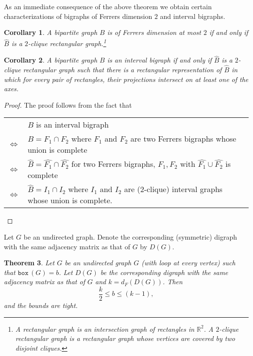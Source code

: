 \documentclass[11pt]{article}
\newtheorem{thm}{Theorem}[section]
\newtheorem{cor}[thm]{Corollary}
\theoremstyle{definition}
\theoremstyle{remark}
\numberwithin{equation}{section}
\newcommand{\Real}{\mathbb{R}}
\newcommand{\BOX}[1]{\texttt{box}\,(#1)}
\begin{document}
As an immediate consequence of the above theorem we obtain certain  characterizations of bigraphs of Ferrers dimension $2$ and interval bigraphs.

\begin{cor}
A bipartite graph $B$ is of Ferrers dimension at most $2$ if and only if $\widehat{B}$ is a $2$-clique rectangular graph.\footnote{A {\em rectangular graph} is an intersection graph of rectangles in $\Real^2$. A {\em $2$-clique rectangular graph} is a rectangular graph whose vertices are covered by two disjoint cliques.}
\end{cor}

\begin{cor}
A bipartite graph $B$ is an interval bigraph if and only if $\widehat{B}$ is a $2$-clique rectangular graph such that there is a rectangular representation of $\widehat{B}$ in which for every pair of rectangles, their projections intersect on at least one of the axes. 
\end{cor}

\begin{proof}
The proof follows from the fact that

\vspace{1em} \begin{tabular}{cl}
 & $B$ is an interval bigraph\\
$\Longleftrightarrow$ & $B=F_1\cap F_2$ where $F_1$ and $F_2$ are two Ferrers bigraphs whose union is complete \cite{M}\\
$\Longleftrightarrow$ & $\widehat{B}=\widehat{F_1}\cap \widehat{F_2}$ for two Ferrers bigraphs, $F_1,F_2$ with $\widehat{F_1}\cup \widehat{F_2}$ is complete\\
$\Longleftrightarrow$ & $\widehat{B}=I_1\cap I_2$ where $I_1$ and $I_2$ are ($2$-clique) interval graphs whose union is complete.
\end{tabular}

\end{proof}

Let $G$ be an undirected graph. Denote the corresponding (symmetric) digraph with the same adjacency matrix as that of $G$ by $D(G)$.

\begin{thm} \label{thm:beta}
Let $G$ be an undirected graph $G$ (with loop at every vertex) such that $\BOX{G}=b$. Let $D(G)$ be the corresponding digraph with the same adjacency matrix as that of $G$ and $k=d_F(D(G))$. Then 
$$\frac{k}{2} \leq b \leq (k-1),$$
and the bounds are tight.
\end{thm}
\end{document}
